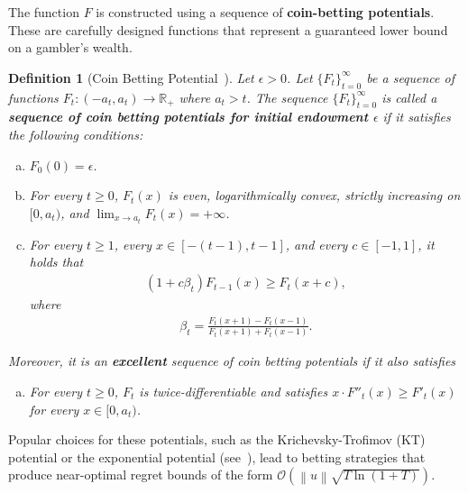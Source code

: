 \documentclass[journal]{IEEEtran} %
\newtheorem{definition}{Definition}
\newcommand{\br}[1]{\left(#1\right)}
\newcommand{\norm}[1]{\left\lVert{#1}\right\rVert}
\begin{document}
The function $F$ is constructed using a sequence of \textbf{coin-betting potentials}.
These are carefully designed functions that represent a guaranteed lower bound on a gambler's wealth.
\begin{definition}[Coin Betting Potential~\cite{orabona_coin_2016}]\label{def:potential}
    Let $\epsilon > 0$.
    Let ${\{ F_t \}}_{t=0}^\infty$ be a sequence of functions $F_t: (-a_t, a_t) \to \mathbb{R}_+$ where $a_t > t$.
    The sequence ${\{ F_t \}}_{t=0}^\infty$ is called a \textbf{sequence of coin betting potentials for initial endowment $\epsilon$} if it satisfies the following conditions:
    \begin{enumerate}[(a)]
        \item $F_0(0) = \epsilon$.
        \item For every $t \geq 0$, $F_t(x)$ is even, logarithmically convex, strictly increasing on $[0, a_t)$, and $\lim_{x \to a_t} F_t(x) = +\infty$. %
        \item For every $t \geq 1$, every $x \in [-(t-1), t-1]$, and every $c \in [-1,1]$, it holds that
              \begin{align}
                  \br{1 + c \beta_t} F_{t-1}(x) \geq F_t(x + c),
              \end{align}
              where
              \begin{align}
                  \beta_t = \frac{F_t(x + 1) - F_t(x - 1)}{F_t(x + 1) + F_t(x - 1)}.
              \end{align}
    \end{enumerate}
    Moreover, it is an \textbf{excellent} sequence of coin betting potentials if it also satisfies
    \begin{enumerate}[(d)]
        \item For every $t \geq 0$, $F_t$ is twice-differentiable and satisfies $x \cdot F''_t(x) \geq F'_t(x)$ for every $x \in [0, a_t)$. %
    \end{enumerate}
\end{definition}
Popular choices for these potentials, such as the Krichevsky-Trofimov (KT) potential or the exponential potential (see~), lead to betting strategies that produce near-optimal regret bounds of the form $\mathcal{O}(\norm{u}\sqrt{T \ln \br{1 + T}})$.
\end{document}
